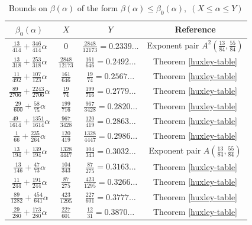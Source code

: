 \begin{table}[ht]
    \def\arraystretch{1.3}
    \centering
    \caption{Bounds on $\beta(\alpha)$ of the form $\beta(\alpha) \le \beta_0(\alpha), \;(X \le \alpha \le Y)$}
    \begin{tabular}{|c|c|c|c|}
    \hline
    $\beta_0(\alpha)$ & $X$ & $Y$ & Reference\\
    \hline
    $ \frac{13}{414} + \frac{346}{414} \alpha $ & $ 0 $ & $ \frac{2848}{12173} = 0.2339\ldots $ & Exponent pair $A^2(\frac{13}{84}, \frac{55}{84})$\\
    \hline
    $\frac{13}{318} + \frac{253}{318} \alpha$ & $\frac{2848}{12173}$ & $\frac{161}{646} = 0.2492\ldots$ & Theorem \ref{huxley-table}\\
    \hline
    $\frac{11}{492} + \frac{107}{123} \alpha$ & $\frac{161}{646}$ & $\frac{19}{74} = 0.2567\ldots$ & Theorem \ref{huxley-table}\\
    \hline
    $ \frac{89}{2706} + \frac{2243}{2706} \alpha $ & $ \frac{19}{74} $ & $ \frac{199}{716} = 0.2779\ldots $ & Theorem \ref{huxley-table}\\
    \hline
    $ \frac{29}{600} + \frac{58}{75} \alpha $ & $ \frac{199}{716} $ & $ \frac{967}{3428} = 0.2820\ldots $ & Theorem \ref{huxley-table}\\
    \hline
    $ \frac{49}{1614} + \frac{1351}{1614} \alpha $ & $ \frac{967}{3428} $ & $ \frac{120}{419} = 0.2863\ldots $ & Theorem \ref{huxley-table}\\
    \hline
    $ \frac{1}{66} + \frac{235}{264} \alpha $ & $ \frac{120}{419} $ & $ \frac{1328}{4447} = 0.2986\ldots $ & Theorem \ref{huxley-table}\\
    \hline
    $ \frac{13}{194} + \frac{139}{194} \alpha $ & $ \frac{1328}{4447} $ & $ \frac{104}{343} = 0.3032\ldots $ & Exponent pair $A(\frac{13}{84}, \frac{55}{84})$\\
    \hline
    $ \frac{13}{146} + \frac{47}{73} \alpha $ & $ \frac{104}{343} $ & $ \frac{87}{275} = 0.3163\ldots $ & Theorem \ref{huxley-table}\\
    \hline
    $ \frac{11}{244} + \frac{191}{244} \alpha $ & $ \frac{87}{275} $ & $ \frac{423}{1295} = 0.3266\ldots $ & Theorem \ref{huxley-table}\\
    \hline
    $ \frac{89}{1282} + \frac{454}{641} \alpha $ & $ \frac{423}{1295} $ & $ \frac{227}{601} = 0.3777\ldots $ & Theorem \ref{huxley-table}\\
    \hline
    $ \frac{29}{280} + \frac{173}{280} \alpha $ & $ \frac{227}{601} $ & $ \frac{12}{31} = 0.3870\ldots $ & Theorem \ref{huxley-table}\\

\end{tabular}
\end{table}
